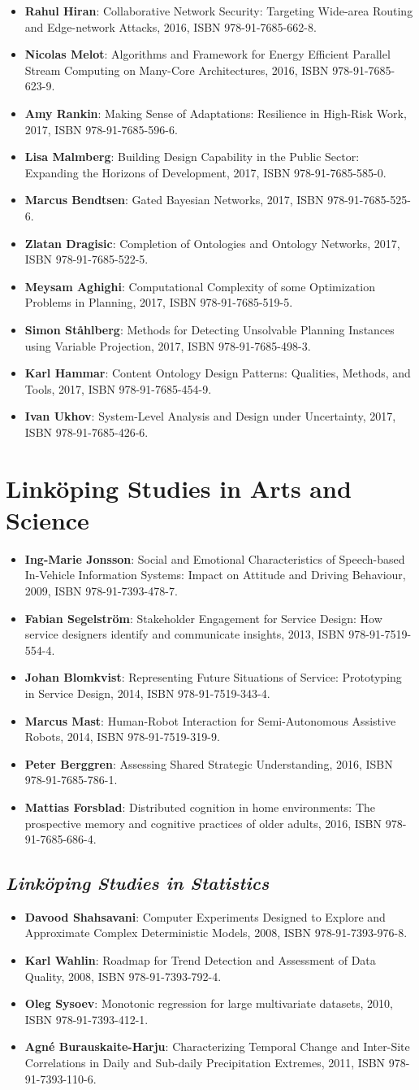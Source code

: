 \documentclass[a4paper,showtrims,twocolumn]{memoir}
\newcommand{\series}[1]{\section*{\footnotesize #1}}
\newcommand{\subseries}[1]{\subsection*{\footnotesize\normalfont\textit{#1}}}
\newenvironment{theses}
  {
    \begin{itemize}
      \setlength{\itemsep}{0.2em}
      \setlength{\parskip}{0em}
      \setlength{\parsep}{0em}
  }
  {
    \end{itemize}
  }
\newcommand{\thesis}[5]{\item[No. #1] \textbf{#2}: #3, #4, ISBN #5.}
\begin{document}
\begin{theses}
    \thesis{1798}{Rahul Hiran}{Collaborative Network Security: Targeting Wide-area Routing and Edge-network Attacks}{2016}{978-91-7685-662-8}
    \thesis{1813}{Nicolas Melot}{Algorithms and Framework for Energy Efficient Parallel Stream Computing on Many-Core Architectures}{2016}{978-91-7685-623-9}
    \thesis{1823}{Amy Rankin}{Making Sense of Adaptations: Resilience in High-Risk Work}{2017}{978-91-7685-596-6}
    \thesis{1831}{Lisa Malmberg}{Building Design Capability in the Public Sector: Expanding the Horizons of Development}{2017}{978-91-7685-585-0}
    \thesis{1851}{Marcus Bendtsen}{Gated Bayesian Networks}{2017}{978-91-7685-525-6}
    \thesis{1852}{Zlatan Dragisic}{Completion of Ontologies and Ontology Networks}{2017}{978-91-7685-522-5}
    \thesis{1854}{Meysam Aghighi}{Computational Complexity of some Optimization Problems in Planning}{2017}{978-91-7685-519-5}
    \thesis{1863}{Simon Ståhlberg}{Methods for Detecting Unsolvable Planning Instances using Variable Projection}{2017}{978-91-7685-498-3}
    \thesis{1879}{Karl Hammar}{Content Ontology Design Patterns: Qualities, Methods, and Tools}{2017}{978-91-7685-454-9}
    \thesis{1887}{Ivan Ukhov}{System-Level Analysis and Design under Uncertainty}{2017}{978-91-7685-426-6}
  \end{theses}

  \series{Linköping Studies in Arts and Science}

  \begin{theses}
    \thesis{504}{Ing-Marie Jonsson}{Social and Emotional Characteristics of Speech-based In-Vehicle Information Systems: Impact on Attitude and Driving Behaviour}{2009}{978-91-7393-478-7}
    \thesis{586}{Fabian Segelström}{Stakeholder Engagement for Service Design: How service designers identify and communicate insights}{2013}{978-91-7519-554-4}
    \thesis{618}{Johan Blomkvist}{Representing Future Situations of Service: Prototyping in Service Design}{2014}{978-91-7519-343-4}
    \thesis{620}{Marcus Mast}{Human-Robot Interaction for Semi-Autonomous Assistive Robots}{2014}{978-91-7519-319-9}
    \thesis{677}{Peter Berggren}{Assessing Shared Strategic Understanding}{2016}{978-91-7685-786-1}
    \thesis{695}{Mattias Forsblad}{Distributed cognition in home environments: The prospective memory and cognitive practices of older adults}{2016}{978-91-7685-686-4}
  \end{theses}

  \subseries{Linköping Studies in Statistics}

  \begin{theses}
    \thesis{9}{Davood Shahsavani}{Computer Experiments Designed to Explore and Approximate Complex Deterministic Models}{2008}{978-91-7393-976-8}
    \thesis{10}{Karl Wahlin}{Roadmap for Trend Detection and Assessment of Data Quality}{2008}{978-91-7393-792-4}
    \thesis{11}{Oleg Sysoev}{Monotonic regression for large multivariate datasets}{2010}{978-91-7393-412-1}
    \thesis{13}{Agné Burauskaite-Harju}{Characterizing Temporal Change and Inter-Site Correlations in Daily and Sub-daily Precipitation Extremes}{2011}{978-91-7393-110-6}
  \end{theses}
\end{document}
